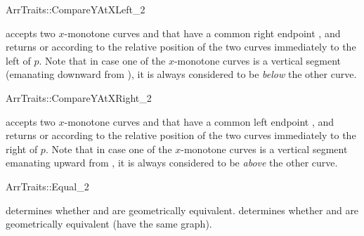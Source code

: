 \ccRefPageBegin
\begin{ccRefConcept}{ArrTraits::CompareYAtXLeft_2}

\ccHasModels{}

  {accepts two $x$-monotone curves  and 
  that have a common right endpoint , and returns  or  according to the relative position of the two
  curves immediately to the left of $p$. Note that in case one of the
  $x$-monotone curves is a vertical segment (emanating downward from
  ), it is always considered to be {\sl below} the other curve.}
\end{ccRefConcept}
\ccRefPageEnd

\ccRefPageBegin
\begin{ccRefConcept}{ArrTraits::CompareYAtXRight_2}

\ccHasModels{}

  {accepts two $x$-monotone curves  and 
  that have a common left endpoint , and returns  or  according to the relative position of the two
  curves immediately to the right of $p$. Note that in case one of the
  $x$-monotone curves is a vertical segment emanating upward from
  , it is always considered to be {\sl above} the other curve.}
\end{ccRefConcept}
\ccRefPageEnd

\ccRefPageBegin
\begin{ccRefConcept}{ArrTraits::Equal_2}

\ccHasModels{}

  {determines whether  and  are geometrically 
  equivalent.}
\ccGlue
{}
  {determines whether  and  are
  geometrically equivalent (have the same graph).}
\end{ccRefConcept}
\ccRefPageEnd
